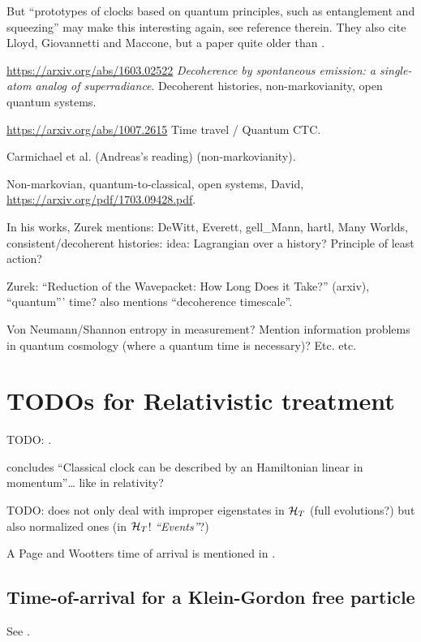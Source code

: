 But
``prototypes of clocks based on quantum principles,
such as entanglement and squeezing''
may make this interesting again, see reference therein.
They also cite Lloyd, Giovannetti and Maccone,
but a paper quite older than \cite{Lloyd:Time}.

\url{https://arxiv.org/abs/1603.02522}
\emph{Decoherence by spontaneous emission: a single-atom analog of superradiance}.
Decoherent histories, non-markovianity, open quantum systems.

\url{https://arxiv.org/abs/1007.2615} Time travel / Quantum CTC.

Carmichael et al. \cite{CarmichaelOQS2017} (Andreas's reading)
(non-markovianity).

Non-markovian, quantum-to-classical, open systems, David,
\url{https://arxiv.org/pdf/1703.09428.pdf}.

In his works, Zurek mentions:
DeWitt, Everett, gell_Mann, hartl, Many Worlds, consistent/decoherent histories:
idea: Lagrangian over a history? Principle of least action?

Zurek: ``Reduction of the Wavepacket: How Long Does it Take?'' (arxiv),
``quantum''' time? \cite{Zurek_Einselect} also mentions
``decoherence timescale''.

Von Neumann/Shannon entropy in measurement? Mention information problems
in quantum cosmology (where a quantum time is necessary)? Etc. etc.

\section{TODOs for Relativistic treatment}

TODO: \cite{RealisticClocks}.

\cite{HarmonicClocks} concludes ``Classical clock can be described by an Hamiltonian linear in momentum''\dots
like in relativity?

TODO: \cite{Lloyd:Time} does not only deal with improper eigenstates in $\mathcal{H}_T$
(full evolutions?)
but also normalized ones (in $\mathcal{H}_T$! \emph{``Events''}?)

A Page and Wootters time of arrival is mentioned in \cite{Gambini_PW}.

\subsection{Time-of-arrival for a Klein-Gordon free particle}

See \cite{Galapon_KG}.


